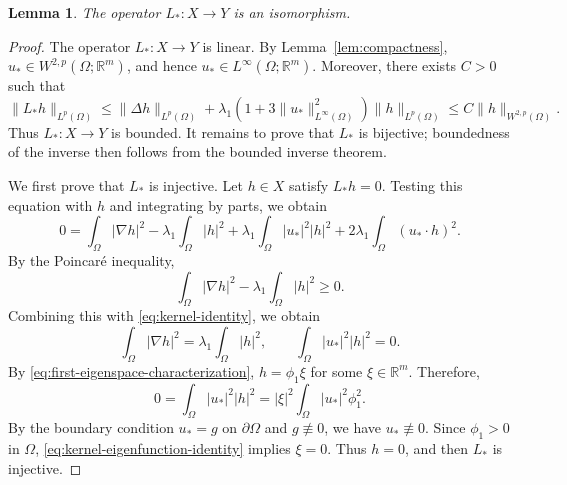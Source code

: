 \documentclass[11pt]{amsart}
\theoremstyle{definition}
\theoremstyle{plain}
\newtheorem{lemma}[theorem]{Lemma}
\newcommand{\abs}[1]{\lvert#1\rvert}
\newcommand{\norm}[1]{\lVert#1\rVert}
\newcommand{\R}{\mathbb{R}}
\numberwithin{equation}{section}
\begin{document}
\begin{lemma}\label{lem:nondegeneracy}
	The operator $L_*\colon X\to Y$ is an isomorphism.
\end{lemma}
\begin{proof}
The operator $L_*\colon X\to Y$ is linear. By
	Lemma~\ref{lem:compactness}, $u_*\in W^{2,p}(\Omega;\R^m)$, and hence
	$u_*\in L^\infty(\Omega;\R^m)$. Moreover, there exists
	$C>0$ such that
	\[
	\norm{L_*h}_{L^p(\Omega)}
	\leq
	\norm{\Delta h}_{L^p(\Omega)}
	+
	\lambda_1
	\left(
	1+3\norm{u_*}_{L^\infty(\Omega)}^2
	\right)
	\norm{h}_{L^p(\Omega)}
	\leq
	C\norm{h}_{W^{2,p}(\Omega)}.
	\]
	Thus $L_*\colon X\to Y$ is bounded. It remains to prove that $L_*$
	is bijective; boundedness of the inverse then follows from the bounded
	inverse theorem.

We first prove that $L_*$ is injective. Let $h\in X$ satisfy
	$L_*h=0$. Testing this equation with $h$ and integrating by parts, we obtain
	\begin{equation}\label{eq:kernel-identity}
	0
	=
	\int_\Omega\abs{\nabla h}^2
	-\lambda_1\int_\Omega\abs{h}^2
	+\lambda_1\int_\Omega\abs{u_*}^2\abs{h}^2
	+2\lambda_1\int_\Omega(u_*\cdot h)^2.
	\end{equation}
	By the Poincar\'e inequality,
	\[
	\int_\Omega\abs{\nabla h}^2
	-\lambda_1\int_\Omega\abs{h}^2
	\geq0.
	\]
	Combining this with \eqref{eq:kernel-identity}, we obtain
	\[
		\int_\Omega\abs{\nabla h}^2
		=
		\lambda_1\int_\Omega\abs{h}^2,
		\qquad
		\int_\Omega\abs{u_*}^2\abs{h}^2=0.
	\]
	By \eqref{eq:first-eigenspace-characterization},
	$h=\phi_1\xi$ for some $\xi\in\R^m$. Therefore,
	\begin{equation}\label{eq:kernel-eigenfunction-identity}
	0
	=
	\int_\Omega\abs{u_*}^2\abs{h}^2
	=
	\abs{\xi}^2
	\int_\Omega\abs{u_*}^2\phi_1^2.
	\end{equation}
	By the boundary condition $u_*=g$ on $\partial\Omega$ and
	$g\not\equiv0$, we have $u_*\not\equiv0$. Since
	$\phi_1>0$ in $\Omega$,
	\eqref{eq:kernel-eigenfunction-identity} implies $\xi=0$.
	Thus $h=0$, and then $L_*$ is injective.
	

\end{proof}
\end{document}
